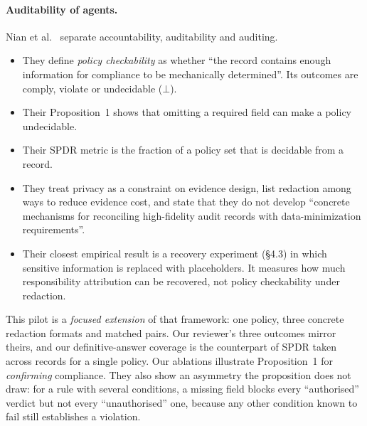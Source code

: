 \documentclass[11pt]{article}
\begin{document}
\paragraph{Auditability of agents.}
Nian et al.~\cite{nian2026auditable} separate accountability, auditability and auditing.
\begin{itemize}
  \item They define \emph{policy checkability} as whether ``the record contains enough information for compliance to be mechanically determined''. Its outcomes are comply, violate or undecidable ($\bot$).
  \item Their Proposition~1 shows that omitting a required field can make a policy undecidable.
  \item Their SPDR metric is the fraction of a policy set that is decidable from a record.
  \item They treat privacy as a constraint on evidence design, list redaction among ways to reduce evidence cost, and state that they do not develop ``concrete mechanisms for reconciling high-fidelity audit records with data-minimization requirements''.
  \item Their closest empirical result is a recovery experiment (\S4.3) in which sensitive information is replaced with placeholders. It measures how much responsibility attribution can be recovered, not policy checkability under redaction.
\end{itemize}
This pilot is a \emph{focused extension} of that framework: one policy, three concrete redaction formats and matched pairs. Our reviewer's three outcomes mirror theirs, and our definitive-answer coverage is the counterpart of SPDR taken across records for a single policy. Our ablations illustrate Proposition~1 for \emph{confirming} compliance. They also show an asymmetry the proposition does not draw: for a rule with several conditions, a missing field blocks every ``authorised'' verdict but not every ``unauthorised'' one, because any other condition known to fail still establishes a violation.
\end{document}
